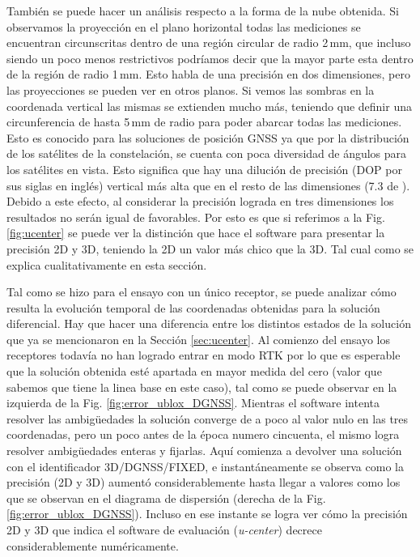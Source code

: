 \documentclass[a4paper,12pt,oneside,onecolumn,final,openright]{book}%
\begin{document}
	También se puede hacer un análisis respecto a la forma de la nube obtenida. Si observamos la proyección en el plano horizontal todas las mediciones se encuentran circunscritas dentro de una región circular de radio 2\,mm, que incluso siendo un poco menos restrictivos podríamos decir que la mayor parte esta dentro de la región de radio 1\,mm. Esto habla de una precisión en dos dimensiones, pero las proyecciones se pueden ver en otros planos. Si vemos las sombras en la coordenada vertical las mismas se extienden mucho más, teniendo que definir una circunferencia de hasta 5\,mm de radio para poder abarcar todas las mediciones. Esto es conocido para las soluciones de posición GNSS ya que por la distribución de los satélites de la constelación, se cuenta con poca diversidad de ángulos para los satélites en vista. Esto significa que hay una dilución de precisión (DOP por sus siglas en inglés) vertical más alta que en el resto de las dimensiones (7.3 de \cite{kaplan}). Debido a este efecto, al considerar la precisión lograda en tres dimensiones los resultados no serán igual de favorables. Por esto es que si referimos a la Fig. \ref{fig:ucenter} se puede ver la distinción que hace el software para presentar la precisión 2D y 3D, teniendo la 2D un valor más chico que la 3D. Tal cual como se explica cualitativamente en esta sección.
	
	Tal como se hizo para el ensayo con un único receptor, se puede analizar cómo resulta la evolución temporal de las coordenadas obtenidas para la solución diferencial. Hay que hacer una diferencia entre los distintos estados de la solución que ya se mencionaron en la Sección \ref{sec:ucenter}. Al comienzo del ensayo los receptores todavía no han logrado entrar en modo RTK por lo que es esperable que la solución obtenida esté apartada en mayor medida del cero (valor que sabemos que tiene la linea base en este caso), tal como se puede observar en la izquierda de la Fig. \ref{fig:error_ublox_DGNSS}. Mientras el software intenta resolver las ambigüedades la solución converge de a poco al valor nulo en las tres coordenadas, pero un poco antes de la época numero cincuenta, el mismo logra resolver ambigüedades enteras y fijarlas. Aquí comienza a devolver una solución con el identificador 3D/DGNSS/FIXED, e instantáneamente se observa como la precisión (2D y 3D) aumentó considerablemente hasta llegar a valores como los que se observan en el diagrama de dispersión (derecha de la Fig. \ref{fig:error_ublox_DGNSS}). Incluso en ese instante se logra ver cómo la precisión 2D y 3D que indica el software de evaluación (\textit{u-center}) decrece considerablemente numéricamente.
	
\end{document}

